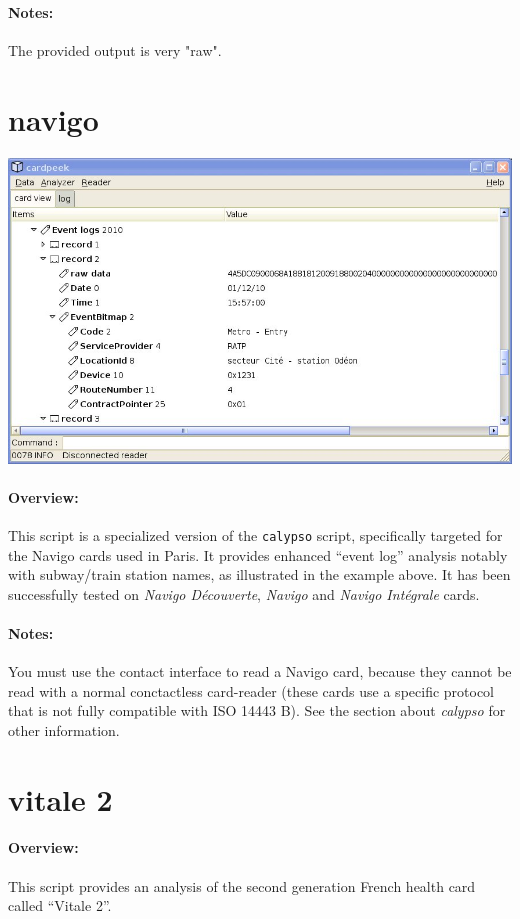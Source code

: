 \documentclass[11pt]{report}
\begin{document}
\paragraph{Notes:}
The provided output is very "raw".

\section{navigo}

\begin{center}
\includegraphics[width=.75\textwidth]{graphics/sample-navigo.jpg}
\end{center}

\paragraph{Overview:}
This script is a specialized version of the \texttt{calypso} script, specifically targeted for the Navigo cards used in Paris.
It provides enhanced ``event log'' analysis notably with subway/train station names, as illustrated in the example above.
It has been successfully tested on \emph{Navigo D\'ecouverte}, \emph{Navigo} and \emph{Navigo Int\'egrale} cards.

\paragraph{Notes:}
You must use the contact interface to read a Navigo card, because they cannot be read with a normal conctactless card-reader (these cards use a specific protocol that is not fully compatible with ISO 14443 B).
See the section about \emph{calypso} for other information.

\section{vitale 2}

\paragraph{Overview:}
This script provides an analysis of the second generation French health card called ``Vitale 2''.
\end{document}

